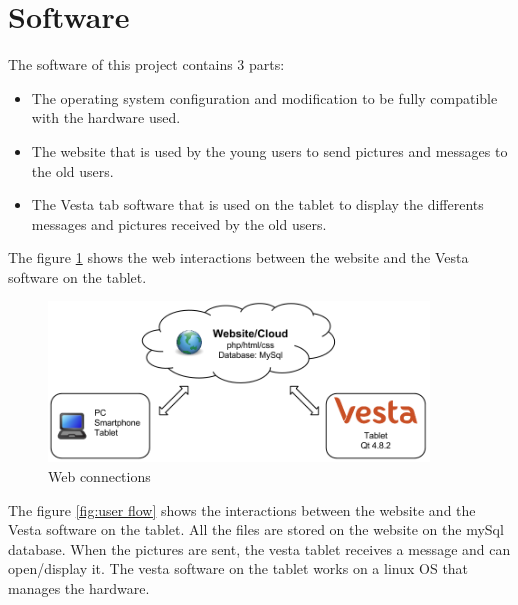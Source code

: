 \section{Software}
The software of this project contains 3 parts:
\begin{itemize}
\item{The operating system configuration and modification to be fully compatible with the hardware used.}
\item{The website that is used by the young users to send pictures and messages to the old users.}
\item{The Vesta tab software that is used on the tablet to display the differents messages and pictures received by the old users.}
\end{itemize}

The figure \ref{fig:web connections} shows the web interactions between the website and the Vesta software on the tablet.

\begin{figure}[!htb]
    \centering
    \includegraphics[width=0.9\textwidth,keepaspectratio]{chap/softFig/web_connections.png}
    \caption{Web connections}
    \label{fig:web connections}
\end{figure}

The figure \ref{fig:user flow} shows the interactions between the website and the Vesta software on the tablet. All the files are stored on the website on the mySql database. When the pictures are sent, the vesta tablet receives a message and can open/display it. The vesta software on the tablet works on a linux OS that manages the hardware.

